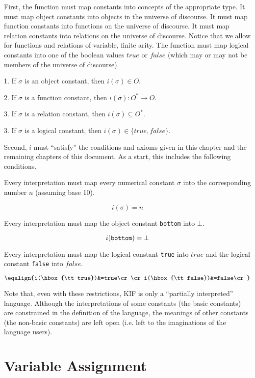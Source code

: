 First, the function must map constants into concepts of the appropriate type.  It
must map object constants into objects in the universe of discourse.  It must map
function constants into functions on the universe of discourse.  It must map relation
constants into relations on the universe of discourse.  Notice that we allow for
functions and relations of variable, finite arity.  The function must map logical
constants into one of the boolean values $true$ or $false$ (which may or may not be
members of the universe of discourse).

\medskip
\item{1.} If $\sigma$ is an object constant, then $i(\sigma)\in O$.

\item{2.} If $\sigma$ is a function constant, then
$i(\sigma):O^*\longrightarrow O$.

\item{3.} If $\sigma$ is a relation constant, then $i(\sigma)\subseteq O^*$.

\item{3.} If $\sigma$ is a logical constant, then $i(\sigma)\in\{true,false\}$.
\medskip

Second, $i$ must ``satisfy'' the conditions and axioms given in this chapter and the
remaining chapters of this document.  As a start, this includes the following
conditions.

Every interpretation must map every numerical constant $\sigma$ into the corresponding
number $n$ (assuming base 10).  

$$i(\sigma)=n$$ 

Every interpretation must map the object constant {\tt bottom} into $\bot$.

$$i(\hbox{\tt bottom})=\bot$$ 

Every interpretation must map the logical constant {\tt true} into $true$ and the
logical constant {\tt false} into $false$.

$$\eqalign{i(\hbox{\tt true})&=true\cr
\cr
i(\hbox{\tt false})&=false\cr}$$ 

Note that, even with these restrictions, KIF is only a ``partially interpreted''
language.  Although the interpretations of some constants (the basic constants) are
constrained in the definition of the language, the meanings of other constants
(the non-basic constants) are left open (i.e. left to the imaginations of the language
users).

\section{Variable Assignment}

